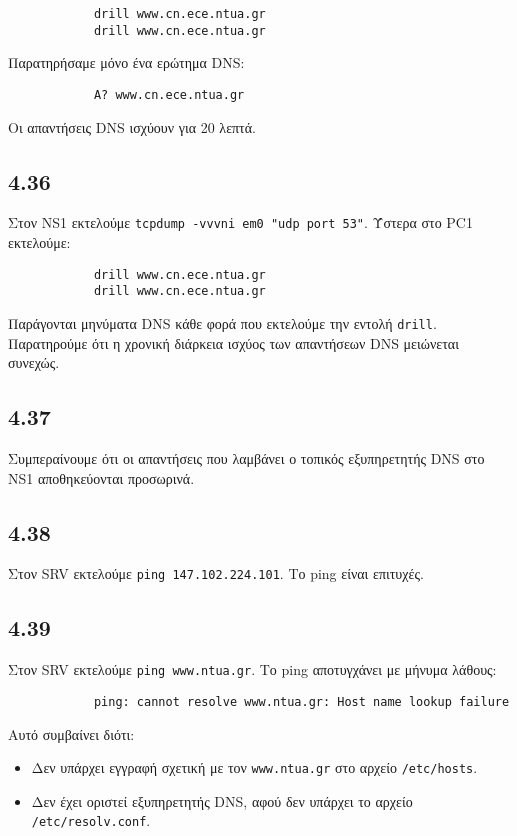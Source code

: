 \documentclass[a4paper, 12pt]{article}
\begin{document}
		\begin{verbatim}
			drill www.cn.ece.ntua.gr
			drill www.cn.ece.ntua.gr
		\end{verbatim}

		Παρατηρήσαμε μόνο ένα ερώτημα DNS:
		
		\begin{verbatim}
			A? www.cn.ece.ntua.gr
		\end{verbatim}
		
		Οι απαντήσεις DNS ισχύουν για 20 λεπτά.
		
	\subsection*{4.36}
		Στον NS1 εκτελούμε \verb|tcpdump -vvvni em0 "udp port 53"|. Ύστερα στο PC1 εκτελούμε:
		
		\begin{verbatim}
			drill www.cn.ece.ntua.gr
			drill www.cn.ece.ntua.gr
		\end{verbatim}
		
		Παράγονται μηνύματα DNS κάθε φορά που εκτελούμε την εντολή \verb|drill|. Παρατηρούμε ότι η χρονική διάρκεια ισχύος των απαντήσεων DNS μειώνεται συνεχώς.

	\subsection*{4.37}
		Συμπεραίνουμε ότι οι απαντήσεις που λαμβάνει ο τοπικός εξυπηρετητής DNS στο NS1 αποθηκεύονται προσωρινά.

	\subsection*{4.38}
		Στον SRV εκτελούμε \verb|ping 147.102.224.101|. Το ping είναι επιτυχές.

	\subsection*{4.39}
		Στον SRV εκτελούμε \verb|ping www.ntua.gr|. Το ping αποτυγχάνει με μήνυμα λάθους:
		
		\begin{verbatim}
			ping: cannot resolve www.ntua.gr: Host name lookup failure
		\end{verbatim}
		
		Αυτό συμβαίνει διότι:
		
		\begin{itemize}
			\item Δεν υπάρχει εγγραφή σχετική με τον \verb|www.ntua.gr| στο αρχείο \verb|/etc/hosts|.
			\item Δεν έχει οριστεί εξυπηρετητής DNS, αφού δεν υπάρχει το αρχείο \verb|/etc/resolv.conf|.
		\end{itemize}
\end{document}
